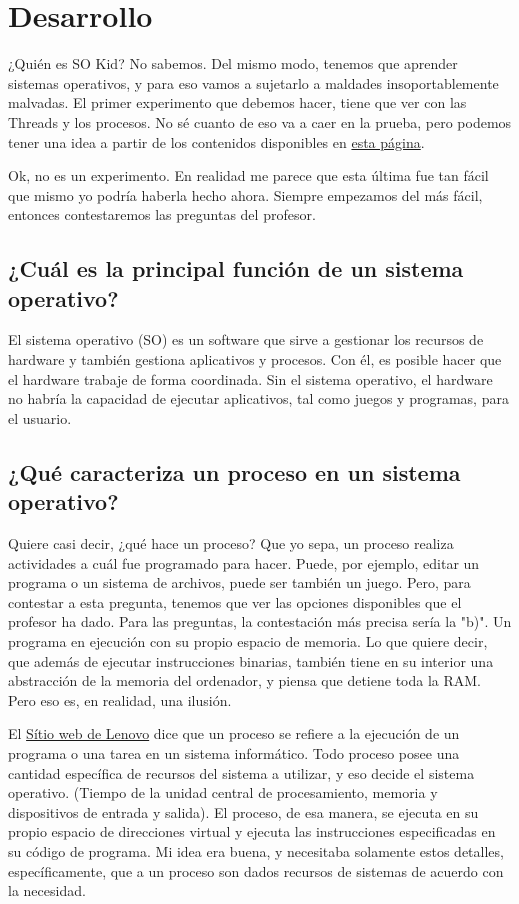 \section{Desarrollo}

¿Quién es SO Kid? No sabemos. Del mismo modo, tenemos que aprender sistemas operativos, 
y para eso vamos a sujetarlo a maldades insoportablemente malvadas. El primer experimento que debemos hacer,
tiene que ver con las Threads y los procesos. No sé cuanto de eso va a caer en la prueba, pero podemos tener una idea 
a partir de los contenidos disponibles en \href{https://github.com/rafinhadufluxo/Materias-UFFS/blob/master/Sistemas%20Operacionais/2025.2%20PROVA%20P1.pdf}{esta página}.

Ok, no es un experimento. En realidad me parece que esta última fue tan fácil que mismo yo podría haberla hecho ahora. 
Siempre empezamos del más fácil, entonces contestaremos las preguntas del profesor.

\subsection{¿Cuál es la principal función de un sistema operativo?}

El sistema operativo (SO) es un software que sirve a gestionar los recursos de hardware 
y también gestiona aplicativos y procesos. Con él, es posible hacer que el hardware
trabaje de forma coordinada. Sin el sistema operativo, el hardware no habría la capacidad de ejecutar
aplicativos, tal como juegos y programas, para el usuario. 

\subsection{¿Qué caracteriza un proceso en un sistema operativo?}
Quiere casi decir, ¿qué hace un proceso? Que yo sepa, un proceso realiza actividades a cuál
fue programado para hacer. Puede, por ejemplo, editar un programa o un sistema de archivos, 
puede ser también un juego. Pero, para contestar a esta pregunta, tenemos que ver las opciones disponibles
que el profesor ha dado. Para las preguntas, la contestación más precisa sería la "b)".
Un programa en ejecución con su propio espacio de memoria. Lo que quiere decir, que además
de ejecutar instrucciones binarias, también tiene en su interior una abstracción de la memoria del ordenador,
y piensa que detiene toda la RAM. Pero eso es, en realidad, una ilusión.

El \href{https://www.lenovo.com/es/es/glossary/process/}{Sítio web de Lenovo} dice que un proceso se refiere
a la ejecución de un programa o una tarea en un sistema informático. Todo proceso posee una cantidad
específica de recursos del sistema a utilizar, y eso decide el sistema operativo. (Tiempo de la unidad central de procesamiento, memoria y dispositivos de entrada y salida).
El proceso, de esa manera, se ejecuta en su propio espacio de direcciones virtual y ejecuta las instrucciones especificadas en su código de programa.
Mi idea era buena, y necesitaba solamente estos detalles, específicamente, que a un proceso son dados recursos de sistemas de acuerdo con la necesidad. 

